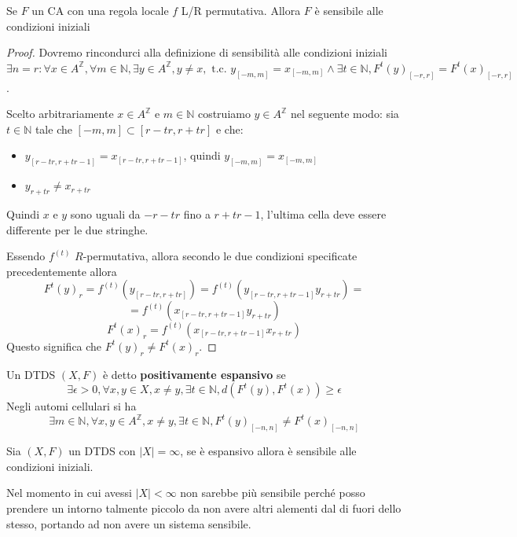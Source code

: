 \begin{nota}
    Se $F$ un CA con una regola locale $f$ L/R permutativa. Allora $F$ è sensibile 
    alle condizioni iniziali
    \begin{proof}
        Dovremo rincondurci alla definizione di sensibilità alle condizioni iniziali
        $\exists n=r: \forall x\in A^\mathbb{Z}, \forall m\in \mathbb{N},
        \exists y \in A^\mathbb{Z}, y\ne x, \text{ t.c. } y_{[-m,m]} = x_{[-m,m]}\land 
        \exists t\in \mathbb{N},F^t(y)_{[-r,r]} =F^t(x)_{[-r,r]}$.

        Scelto arbitrariamente $x\in A^\mathbb{Z}$ e $m\in \mathbb{N}$ costruiamo
        $y\in A^\mathbb{Z}$ nel seguente modo: sia $t\in\mathbb{N}$ tale che 
        $[-m,m]\subset [r-tr,r+tr]$ e che:
        \begin{itemize}
            \item $y_{[r-tr, r+tr-1]} = x_{[r-tr, r+tr-1]}$, quindi $y_{[-m,m]} = x_{[-m,m]}$
            \item $y_{r+tr} \ne x_{r+tr}$
        \end{itemize} 
        Quindi $x$ e $y$ sono uguali da $-r-tr$ fino a $r+tr-1$, l'ultima cella 
        deve essere differente per le due stringhe.

        Essendo $f^{(t)}$ $R$-permutativa, allora secondo le due condizioni 
        specificate precedentemente allora 
        $$F^t(y)_r=f^{(t)}(y_{[r-tr, r+tr]})=f^{(t)}(y_{[r-tr, r+tr-1]}y_{r+tr})=$$
        $$=f^{(t)}(x_{[r-tr, r+tr-1]}y_{r+tr})$$
        $$F^t(x)_r=f^{(t)}(x_{[r-tr, r+tr-1]}x_{r+tr}) $$
        Questo significa che $F^t(y)_r \ne F^t(x)_r$.
    \end{proof}
\end{nota}

\begin{definizione}
    Un DTDS $(X,F)$ è detto \textbf{positivamente espansivo} se 
    $$\exists \epsilon >0, \forall x,y\in X, x\ne y, \exists t\in \mathbb{N}, d(F^t(y),F^t(x))\ge \epsilon$$
    Negli automi cellulari si ha
    $$\exists m\in \mathbb{N}, \forall x,y\in A^\mathbb{Z}, x\ne y, \exists t\in \mathbb{N}, F^t(y)_{[-n,n]} \ne F^t(x)_{[-n,n]}$$
\end{definizione}

\begin{teorema}
    Sia $(X,F)$ un DTDS con $|X|=\infty$, se è espansivo allora è sensibile alle condizioni iniziali.

    Nel momento in cui avessi $|X|<\infty$ non sarebbe più sensibile perché posso
    prendere un intorno talmente piccolo da non avere altri alementi dal di fuori 
    dello stesso, portando ad non avere un sistema sensibile. 
\end{teorema}

